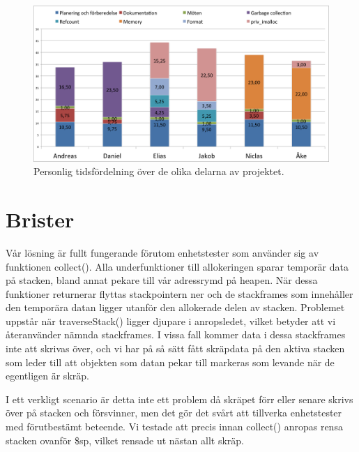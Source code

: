 \documentclass{article}
\begin{document}
\begin{figure}[H]
  \includegraphics[width=\columnwidth]{../bilder/chart_people.png}
  \caption{Personlig tidsfördelning över de olika delarna av projektet.}
  \label{fig:chart_people}
\end{figure}


\section{Brister}

Vår lösning är fullt fungerande förutom enhetstester som använder sig av funktionen collect(). Alla underfunktioner till allokeringen sparar temporär data på stacken, bland annat pekare till vår adressrymd på heapen. När dessa funktioner returnerar flyttas stackpointern ner och de stackframes som innehåller den temporära datan ligger utanför den allokerade delen av stacken. Problemet uppstår när traverseStack() ligger djupare i anropsledet, vilket betyder att vi återanvänder nämnda stackframes. I vissa fall kommer data i dessa stackframes inte att skrivas över, och vi har på så sätt fått skräpdata på den aktiva stacken som leder till att objekten som datan pekar till markeras som levande när de egentligen är skräp.

I ett verkligt scenario är detta inte ett problem då skräpet förr eller senare skrivs över på stacken och försvinner, men det gör det svårt att tillverka enhetstester med förutbestämt beteende. Vi testade att precis innan collect() anropas rensa stacken ovanför \$sp, vilket rensade ut nästan allt skräp.
\end{document}
